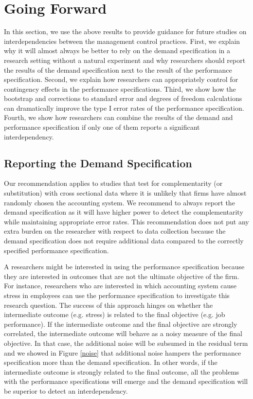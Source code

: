 \documentclass[12pt]{article}
\begin{document}
\section{Going Forward}

In this section, we use the above results to provide guidance for future studies on interdependencies between the management control practices. First, we explain why it will almost always be better to rely on the demand specification in a research setting without a natural experiment and why researchers should report the results of the demand specification next to the result of the performance specification. Second, we explain how researchers can appropriately control for contingency effects in the performance specifications. Third, we show how the bootstrap and corrections to standard error and degrees of freedom calculations can dramatically improve the type I error rates of the performance specification. Fourth, we show how researchers can combine the results of the demand and performance specification if only one of them reports a significant interdependency.

\subsection{Reporting the Demand Specification}

Our recommendation applies to studies that test for complementarity (or substitution) with cross sectional data where it is unlikely that firms have almost randomly chosen the accounting system. We recommend to always report the demand specification as it will have higher power to detect the complementarity while maintaining appropriate error rates. This recommendation does not put any extra burden on the researcher with respect to data collection because the demand specification does not require additional data compared to the correctly specified performance specification. 

A researchers might be interested in using the performance specification because they are interested in outcomes that are not the ultimate objective of the firm. For instance, researchers who are interested in which accounting system cause stress in employees \citep{shields_design_2000} can use the performance specification to investigate this research question. The success of this approach hinges on whether the intermediate outcome (e.g. stress) is related to the final objective (e.g. job performance). If the intermediate outcome and the final objective are strongly correlated, the intermediate outcome will behave as a noisy measure of the final objective. In that case, the additional noise will be subsumed in the residual term and we showed in Figure \ref{noise} that additional noise hampers the performance specification more than the demand specification. In other words, if the intermediate outcome is strongly related to the final outcome, all the problems with the performance specifications will emerge and the demand specification will be superior to detect an interdependency.
\end{document}
